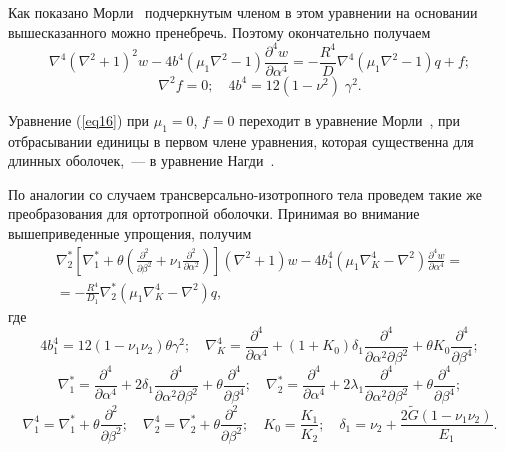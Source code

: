 \documentclass[press]{vestnik}
\begin{document}
Как показано Морли~\cite{B14} подчеркнутым членом в этом уравнении на основании 
вышесказанного можно пренебречь.
Поэтому окончательно получаем
\begin{equation}
\label{eq16}
\nabla^{4}\left( {\nabla^{2}+1} \right)^{2}w-4b^{4}\left( {\mu_{1} \nabla 
^{2}-1} \right)\frac{\partial^{4}w}{\partial \alpha 
^{4}}=-\frac{R^{4}}{D}\nabla^{4}\left( {\mu_{1} \nabla^{2}-1} 
\right)q+f;
\end{equation}
\[
\nabla^{2}f=0;
\quad
4b^{4}=12\left( {1-\nu^{2}} \right)\;\gamma^{2}.
\]

Уравнение (\ref{eq16}) при $\mu_{1} =0$, $f=0$ переходит в уравнение Морли~\cite{B14}, при 
отбрасывании единицы в первом члене уравнения, которая существенна для 
длинных оболочек,~--- в уравнение Нагди~\cite{B15}.

По аналогии со случаем трансверсально-изотропного тела проведем такие же 
преобразования для ортотропной оболочки. Принимая во внимание 
вышеприведенные упрощения, получим
\begin{multline}\label{eq17}
 \nabla_{2}^{\ast } \left[ {\nabla_{1}^{\ast } +\theta \left( {\frac{\partial^{2}}{\partial \beta^{2}}+\nu_{1} \frac{\partial^{2}}{\partial \alpha^{2}}} \right)} \right]\left( {\nabla^{2}+1} \right)w-4b_{1}^{4} \left( {\mu_{1} \nabla_{K}^{4} -\nabla^{2}} \right)\frac{\partial^{4}w}{\partial \alpha^{4}}= \\
 = -\frac{R^{4}}{D_{1} }\nabla_{2}^{\ast } \left( {\mu_{1} \nabla_{K}^{4} -\nabla^{2}} \right)q,
\end{multline}
где 
\[
4b_{1}^{4} =12\left( {1-\nu_{1} \nu_{2} } \right)\theta \gamma^{2};
\quad 
\nabla_{K}^{4} =\frac{\partial^{4}}{\partial \alpha^{4}}+\left( {1+K_{0} 
} \right)\delta_{1} \frac{\partial^{4}}{\partial \alpha^{2}\partial \beta 
^{2}}+\theta K_{0} \frac{\partial^{4}}{\partial \beta^{4}};
\] 
\[
\nabla_{1}^{\ast } =\frac{\partial^{4}}{\partial \alpha^{4}}+2\delta_{1} 
\frac{\partial^{4}}{\partial \alpha^{2}\partial \beta^{2}}+\theta 
\frac{\partial^{4}}{\partial \beta^{4}};
\quad
\nabla_{2}^{\ast } =\frac{\partial^{4}}{\partial \alpha^{4}}+2\lambda 
_{1} \frac{\partial^{4}}{\partial \alpha^{2}\partial \beta^{2}}+\theta 
\frac{\partial^{4}}{\partial \beta^{4}};
\]
\[
\nabla_{1}^{4} =\nabla_{1}^{\ast } +\theta \frac{\partial^{2}}{\partial 
\beta^{2}};
\quad
\nabla_{2}^{4} =\nabla_{2}^{\ast } +\theta \frac{\partial^{2}}{\partial 
\beta^{2}};
\quad
K_{0} =\frac{K_{1} }{K_{2} };
\quad
\delta_{1} =\nu_{2} +\frac{2\tilde{{G}}\left( {1-\nu_{1} \nu_{2} } 
\right)}{E_{1} }.
\]
\end{document}

